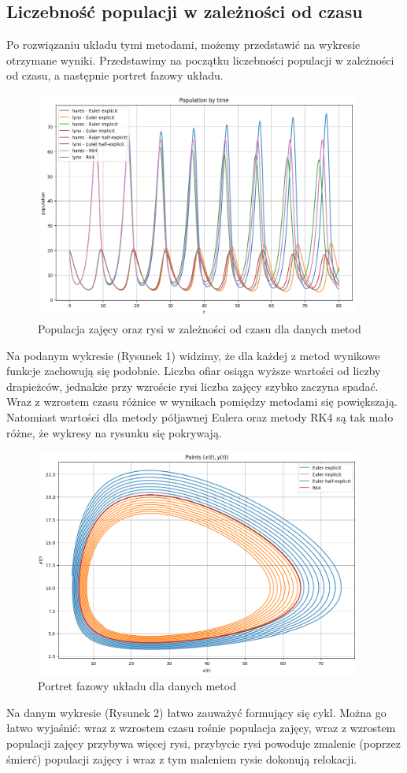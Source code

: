 \documentclass{article}
\begin{document}
\subsection{Liczebność populacji w zależności od czasu}
Po rozwiązaniu układu tymi metodami, możemy przedstawić na wykresie otrzymane wyniki. Przedstawimy na początku liczebności populacji w zależności od czasu, a następnie portret fazowy układu.
\begin{figure}[H]
    \centering
    \includegraphics[width=0.95\textwidth]{1}
    \caption{Populacja zajęcy oraz rysi w zależności od czasu dla danych metod}
    \label{fig:mesh}
\end{figure}
Na podanym wykresie (Rysunek 1) widzimy, że dla każdej z metod wynikowe funkcje zachowują się podobnie. Liczba ofiar osiąga wyższe wartości od liczby drapieżców, jednakże przy wzroście rysi liczba zajęcy szybko zaczyna spadać. Wraz z wzrostem czasu różnice w wynikach pomiędzy metodami się powiększają. Natomiast wartości dla metody półjawnej Eulera oraz metody RK4 są tak mało różne, że wykresy na rysunku się pokrywają.
\begin{figure}[H]
    \centering
    \includegraphics[width=0.95\textwidth]{2}
    \caption{Portret fazowy układu dla danych metod}
    \label{fig:mesh}
\end{figure}
Na danym wykresie (Rysunek 2) łatwo zauważyć formujący się cykl. Można go łatwo wyjaśnić: wraz z wzrostem czasu rośnie populacja zajęcy, wraz z wzrostem populacji zajęcy przybywa więcej rysi, przybycie rysi powoduje zmalenie (poprzez śmierć) populacji zajęcy i wraz z tym maleniem rysie dokonują relokacji.
\end{document}
